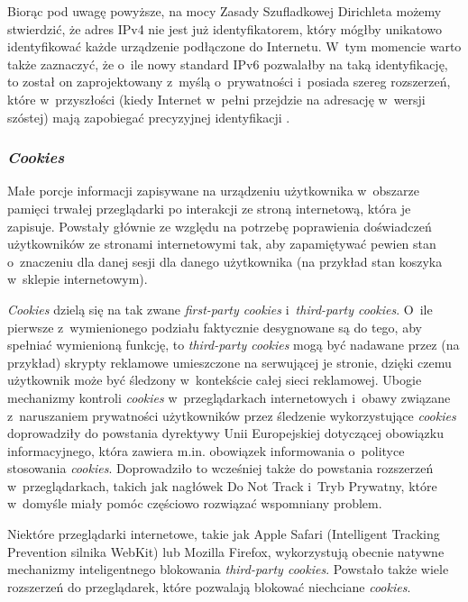 Biorąc pod uwagę powyższe, na mocy Zasady Szufladkowej Dirichleta możemy
stwierdzić, że adres IPv4 nie jest już identyfikatorem, który mógłby unikatowo
identyfikować każde urządzenie podłączone do Internetu. W~tym momencie warto
także zaznaczyć, że o~ile nowy standard IPv6 pozwalałby na taką identyfikację,
to został on zaprojektowany z~myślą o~prywatności i~posiada szereg rozszerzeń,
które w~przyszłości (kiedy Internet w~pełni przejdzie na adresację w~wersji
szóstej) mają zapobiegać precyzyjnej identyfikacji \cite{narten2001privacy}.

\subsubsection{\emph{Cookies}}
Małe porcje informacji zapisywane na urządzeniu użytkownika w~obszarze pamięci
trwałej przeglądarki po interakcji ze stroną internetową, która je zapisuje.
Powstały głównie ze względu na potrzebę poprawienia doświadczeń użytkowników ze
stronami internetowymi tak, aby zapamiętywać pewien stan o~znaczeniu dla danej
sesji dla danego użytkownika (na przykład stan koszyka w~sklepie internetowym).

\emph{Cookies} dzielą się na tak zwane \emph{first-party cookies}
i~\emph{third-party cookies}. O~ile pierwsze z~wymienionego podziału faktycznie
desygnowane są do tego, aby spełniać wymienioną funkcję, to \emph{third-party
cookies} mogą być nadawane przez (na przykład) skrypty reklamowe umieszczone na
serwującej je stronie, dzięki czemu użytkownik może być śledzony w~kontekście
całej sieci reklamowej. Ubogie mechanizmy kontroli \emph{cookies}
w~przeglądarkach internetowych i~obawy związane z~naruszaniem prywatności
użytkowników przez śledzenie wykorzystujące \emph{cookies} doprowadziły do
powstania dyrektywy Unii Europejskiej dotyczącej obowiązku informacyjnego, która
zawiera m.in. obowiązek informowania o~polityce stosowania \emph{cookies}.
Doprowadziło to wcześniej także do powstania rozszerzeń w~przeglądarkach, takich
jak nagłówek Do Not Track i~Tryb Prywatny, które w~domyśle miały pomóc częściowo
rozwiązać wspomniany problem.

Niektóre przeglądarki internetowe, takie jak Apple Safari (Intelligent Tracking
Prevention silnika WebKit) lub Mozilla Firefox, wykorzystują obecnie natywne
mechanizmy inteligentnego blokowania \emph{third-party cookies}. Powstało także
wiele rozszerzeń do przeglądarek, które pozwalają blokować niechciane
\emph{cookies}.


